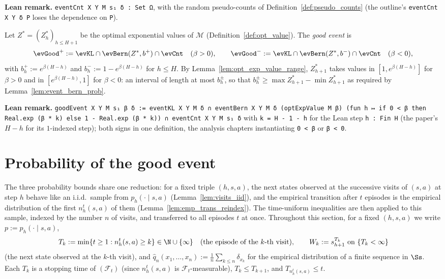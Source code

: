 \textbf{Lean remark.} \texttt{eventCnt X Y M s₁ δ : Set Ω}, with the random pseudo-counts of
Definition~\ref{def:pseudo_counts} (the outline's \texttt{eventCnt X Y δ P} loses the
dependence on \texttt{P}).

\begin{definition}\label{def:good_event}
\leanok
{}
Let $Z^* = (Z^*_h)_{h \le H + 1}$ be the optimal exponential values of $\mathcal M$
(Definition~\ref{def:opt_value}). The \emph{good event} is
\[
  \evGood^+ := \evKL \cap \evBern(Z^*, b^+) \cap \evCnt \quad (\beta > 0),
  \qquad
  \evGood^- := \evKL \cap \evBern(Z^*, b^-) \cap \evCnt \quad (\beta < 0),
\]
with $b^+_h := e^{\beta(H - h)}$ and $b^-_h := 1 - e^{\beta(H - h)}$ for $h \le H$. By
Lemma~\ref{lem:opt_exp_value_range}, $Z^*_{h+1}$ takes values in $[1, e^{\beta(H - h)}]$ for
$\beta > 0$ and in $[e^{\beta(H - h)}, 1]$ for $\beta < 0$: an interval of length at most $b^\pm_h$,
so that $b^\pm_h \ge \max Z^*_{h+1} - \min Z^*_{h+1}$ as required by Lemma~\ref{lem:event_bern_prob}.
\end{definition}

\textbf{Lean remark.} \texttt{goodEvent X Y M s₁ β δ := eventKL X Y M δ ∩ eventBern X Y M δ (optExpValue M β) (fun h ↦ if 0 < β then Real.exp (β * k) else 1 - Real.exp (β * k)) ∩ eventCnt X Y M s₁ δ}
with \texttt{k = H - 1 - h} for the Lean step \texttt{h : Fin H} (the paper's $H - h$ for its
$1$-indexed step); both signs in one definition, the analysis chapters instantiating
\texttt{0 < β} or \texttt{β < 0}.

\section{Probability of the good event}
\label{sec:empirical_good_event}

The three probability bounds share one reduction: for a fixed triple $(h, s, a)$, the next
states observed at the successive visits of $(s, a)$ at step $h$ behave like an i.i.d.\
sample from $p_h(\cdot \mid s, a)$ (Lemma~\ref{lem:visits_iid}), and the empirical transition
after $t$ episodes is the empirical distribution of the first $n_h^t(s, a)$ of them
(Lemma~\ref{lem:emp_trans_reindex}). The time-uniform inequalities are then applied to this
sample, indexed by the number $n$ of visits, and transferred to all episodes $t$ at once.
Throughout this section, for a fixed $(h, s, a)$ we write $p := p_h(\cdot \mid s, a)$,
\[
  T_k := \min\{t \ge 1 : n_h^t(s, a) \ge k\} \in \N \cup \{\infty\}
  \quad\text{(the episode of the $k$-th visit)},
  \qquad
  W_k := s^{T_k}_{h+1} \text{ on } \{T_k < \infty\}
\]
(the next state observed at the $k$-th visit), and $\hat q_n(x_1, \dots, x_n) := \frac1n \sum_{k \le n} \delta_{x_k}$
for the empirical distribution of a finite sequence in $\Ss$. Each $T_k$ is a stopping time of
$(\mathcal F_t)$ (since $n_h^t(s, a)$ is $\mathcal F_t$-measurable), $T_k \le T_{k+1}$, and
$T_{n_h^t(s, a)} \le t$.

